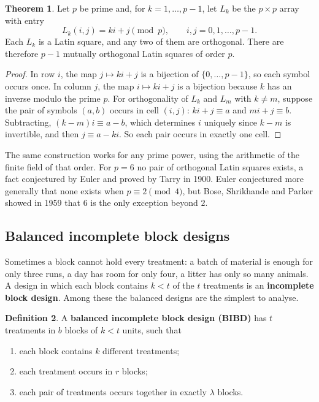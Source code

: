\documentclass[11pt,a4paper]{article}
\numberwithin{equation}{section}
\theoremstyle{definition}
\newtheorem{thm}{Theorem}[subsection]
\newtheorem{defn}[thm]{Definition}
\begin{document}
\begin{thm}\label{thm:mols}
Let $p$ be prime and, for $k = 1, \dots, p - 1$, let $L_k$ be the $p \times p$ array with entry
\[
L_k(i, j) = ki + j \pmod p , \qquad i, j = 0, 1, \dots, p - 1 .
\]
Each $L_k$ is a Latin square, and any two of them are orthogonal. There are therefore $p - 1$ mutually orthogonal Latin squares of order $p$.
\end{thm}

\begin{proof}
In row $i$, the map $j \mapsto ki + j$ is a bijection of $\{0, \dots, p - 1\}$, so each symbol occurs once. In column $j$, the map $i \mapsto ki + j$ is a bijection
because $k$ has an inverse modulo the prime $p$. For orthogonality of $L_k$ and $L_m$ with $k \ne m$, suppose the pair of symbols $(a, b)$ occurs in cell $(i, j)$:
$ki + j \equiv a$ and $mi + j \equiv b$. Subtracting, $(k - m)i \equiv a - b$, which determines $i$ uniquely since $k - m$ is invertible, and then $j \equiv a - ki$. So each pair
occurs in exactly one cell.
\end{proof}

The same construction works for any prime power, using the arithmetic of the finite field of that order. For $p = 6$ no pair of orthogonal Latin squares exists, a fact conjectured by Euler and proved by Tarry in 1900.
Euler conjectured more generally that none exists when $p \equiv 2 \pmod 4$, but Bose, Shrikhande and Parker showed in 1959 that $6$ is the only exception
beyond $2$.

\subsection{Balanced incomplete block designs}
Sometimes a block cannot hold every treatment: a batch of material is enough for only three runs, a day has room for only four, a litter has
only so many animals. A design in which each block contains $k < t$ of the $t$ treatments is an \textbf{incomplete block design}. Among these the
balanced designs are the simplest to analyse.

\begin{defn}
A \textbf{balanced incomplete block design (BIBD)} has $t$ treatments in $b$ blocks of $k < t$ units, such that
\begin{enumerate}[label=(\roman*)]
\item each block contains $k$ different treatments;
\item each treatment occurs in $r$ blocks;
\item each pair of treatments occurs together in exactly $\lambda$ blocks.
\end{enumerate}
\end{defn}
\end{document}
